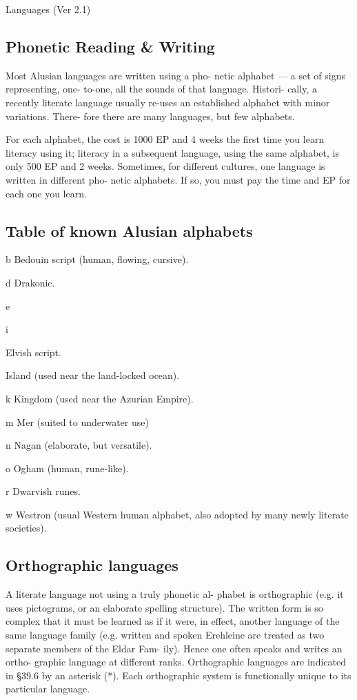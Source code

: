 \begin{Chapter}{Languages (Ver 2.1)}
\subsection{Phonetic Reading \& Writing}

Most  Alusian  languages  are  written  using  a  pho-
netic  alphabet  —  a  set  of  signs  representing,  one-
to-one,  all  the  sounds  of  that  language.  Histori-
cally, a recently literate language usually re-uses an 
established  alphabet  with  minor  variations.  There-
fore there are many languages, but few alphabets. 

For each alphabet, the cost is 1000 EP and 4 weeks 
the first time you learn literacy using it; literacy in 
a subsequent language, using the same alphabet, is 
only 500 EP and 2 weeks. Sometimes, for different 
cultures,  one  language  is  written  in  different  pho-
netic  alphabets.  If  so,  you  must  pay  the  time  and 
EP for each one you learn. 

\subsection{Table of known Alusian alphabets}

b   Bedouin script (human, flowing, cursive). 

d   Drakonic. 

e  

i  

Elvish script. 

Island (used near the land-locked ocean). 

k   Kingdom (used near the Azurian Empire). 

m   Mer (suited to underwater use) 

n   Nagan (elaborate, but versatile).  

o   Ogham (human, rune-like). 

r   Dwarvish runes. 

w   Westron (usual Western human alphabet, also 
adopted by many newly literate societies). 

\subsection{Orthographic languages}

A  literate  language  not  using  a  truly  phonetic  al-
phabet  is  orthographic  (e.g.  it  uses  pictograms,  or 
an elaborate spelling structure). The written form is 
so complex that it must be learned as if it were, in 
effect,  another  language  of  the  same  language 
family  (e.g.  written  and  spoken  Erehleine  are 
treated as two separate members of the Eldar Fam-
ily).  Hence  one  often  speaks  and  writes  an  ortho-
graphic  language  at  different  ranks.  Orthographic 
languages are indicated in §39.6 by an asterisk (*). 
Each orthographic system is functionally unique to 
its particular language. 


\end{Chapter}
